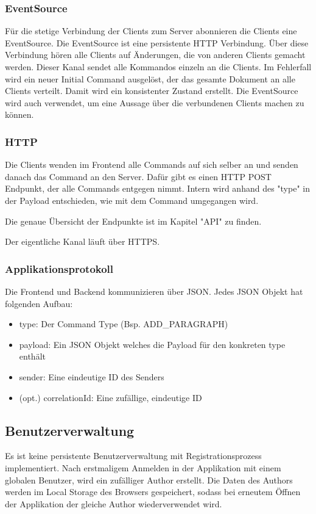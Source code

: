 \subsubsection{EventSource}
Für die stetige Verbindung der Clients zum Server abonnieren die Clients eine EventSource.
Die EventSource ist eine persistente HTTP Verbindung.
Über diese Verbindung hören alle Clients auf Änderungen, die von anderen Clients gemacht werden.
Dieser Kanal sendet alle Kommandos einzeln an die Clients.
Im Fehlerfall wird ein neuer Initial Command ausgelöst, der das gesamte Dokument an alle Clients verteilt.
Damit wird ein konsistenter Zustand erstellt.
Die EventSource wird auch verwendet, um eine Aussage über die verbundenen Clients machen zu können.

\subsubsection{HTTP}
Die Clients wenden im Frontend alle Commands auf sich selber an und senden danach das Command an den Server.
Dafür gibt es einen HTTP POST Endpunkt, der alle Commands entgegen nimmt.
Intern wird anhand des "type" in der Payload entschieden, wie mit dem Command umgegangen wird.

Die genaue Übersicht der Endpunkte ist im Kapitel "API" zu finden.

Der eigentliche Kanal läuft über HTTPS.

\subsubsection{Applikationsprotokoll}
Die Frontend und Backend kommunizieren über JSON.
Jedes JSON Objekt hat folgenden Aufbau:
\begin{itemize}
    \item type: Der Command Type (Bsp. ADD\_PARAGRAPH)
    \item payload: Ein JSON Objekt welches die Payload für den konkreten type enthält
    \item sender: Eine eindeutige ID des Senders
    \item (opt.) correlationId: Eine zufällige, eindeutige ID
\end{itemize}

\subsection{Benutzerverwaltung}
Es ist keine persistente Benutzerverwaltung mit Registrationsprozess implementiert.
Nach erstmaligem Anmelden in der Applikation mit einem globalen Benutzer, wird ein zufälliger Author erstellt.
Die Daten des Authors werden im Local Storage des Browsers gespeichert, sodass bei erneutem Öffnen der Applikation der gleiche Author wiederverwendet wird.
